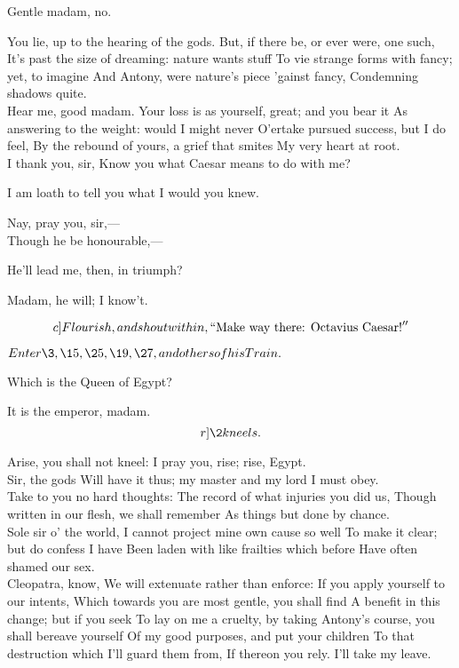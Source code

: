 \documentclass{book}
\begin{document}
	Gentle madam, no.

\2	You lie, up to the hearing of the gods.
	But, if there be, or ever were, one such,
	It's past the size of dreaming: nature wants stuff
	To vie strange forms with fancy; yet, to imagine
	And Antony, were nature's piece 'gainst fancy,
	Condemning shadows quite. \\

	Hear me, good madam.
	Your loss is as yourself, great; and you bear it
	As answering to the weight: would I might never
	O'ertake pursued success, but I do feel,
	By the rebound of yours, a grief that smites
	My very heart at root. \\

\2	I thank you, sir,
	Know you what Caesar means to do with me?

	I am loath to tell you what I would you knew.

\2	Nay, pray you, sir,--- \\

	Though he be honourable,---

\2	He'll lead me, then, in triumph?

	Madam, he will; I know't.

        \[c]Flourish, and shout within,\\
        ``\textup{Make way there: Octavius Caesar!}''\]

	\(Enter \3, \15, \25, \19, \27, and others of his Train.\)

\3	Which is the Queen of Egypt?

	It is the emperor, madam.  \[r]\2 kneels.\]

\3	Arise, you shall not kneel:
	I pray you, rise; rise, Egypt. \\

\2	Sir, the gods
	Will have it thus; my master and my lord
	I must obey. \\

\3	                  Take to you no hard thoughts:
	The record of what injuries you did us,
	Though written in our flesh, we shall remember
	As things but done by chance. \\

\2	Sole sir o' the world,
	I cannot project mine own cause so well
	To make it clear; but do confess I have
	Been laden with like frailties which before
	Have often shamed our sex. \\

\3	Cleopatra, know,
	We will extenuate rather than enforce:
	If you apply yourself to our intents,
	Which towards you are most gentle, you shall find
	A benefit in this change; but if you seek
	To lay on me a cruelty, by taking
	Antony's course, you shall bereave yourself
	Of my good purposes, and put your children
	To that destruction which I'll guard them from,
	If thereon you rely. I'll take my leave.
\end{document}

